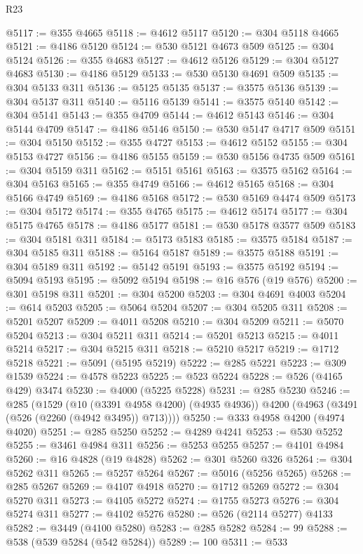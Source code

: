 \begin{lexlean}{R23}
\begin{coremodule}
@5117 := @355 @4665
@5118 := @4612 @5117
@5120 := @304 @5118 @4665
@5121 := @4186 @5120
@5124 := @530 @5121 @4673 @509
@5125 := @304 @5124
@5126 := @355 @4683
@5127 := @4612 @5126
@5129 := @304 @5127 @4683
@5130 := @4186 @5129
@5133 := @530 @5130 @4691 @509
@5135 := @304 @5133 @311
@5136 := @5125 @5135
@5137 := @3575 @5136
@5139 := @304 @5137 @311
@5140 := @5116 @5139
@5141 := @3575 @5140
@5142 := @304 @5141
@5143 := @355 @4709
@5144 := @4612 @5143
@5146 := @304 @5144 @4709
@5147 := @4186 @5146
@5150 := @530 @5147 @4717 @509
@5151 := @304 @5150
@5152 := @355 @4727
@5153 := @4612 @5152
@5155 := @304 @5153 @4727
@5156 := @4186 @5155
@5159 := @530 @5156 @4735 @509
@5161 := @304 @5159 @311
@5162 := @5151 @5161
@5163 := @3575 @5162
@5164 := @304 @5163
@5165 := @355 @4749
@5166 := @4612 @5165
@5168 := @304 @5166 @4749
@5169 := @4186 @5168
@5172 := @530 @5169 @4474 @509
@5173 := @304 @5172
@5174 := @355 @4765
@5175 := @4612 @5174
@5177 := @304 @5175 @4765
@5178 := @4186 @5177
@5181 := @530 @5178 @3577 @509
@5183 := @304 @5181 @311
@5184 := @5173 @5183
@5185 := @3575 @5184
@5187 := @304 @5185 @311
@5188 := @5164 @5187
@5189 := @3575 @5188
@5191 := @304 @5189 @311
@5192 := @5142 @5191
@5193 := @3575 @5192
@5194 := @5094 @5193
@5195 := @5092 @5194
@5198 := @16 @576 (@19 @576)
@5200 := @301 @5198 @311
@5201 := @304 @5200
@5203 := @304 @4691 @4003
@5204 := @614 @5203
@5205 := @5064 @5204
@5207 := @304 @5205 @311
@5208 := @5201 @5207
@5209 := @4011 @5208
@5210 := @304 @5209
@5211 := @5070 @5204
@5213 := @304 @5211 @311
@5214 := @5201 @5213
@5215 := @4011 @5214
@5217 := @304 @5215 @311
@5218 := @5210 @5217
@5219 := @1712 @5218
@5221 := @5091 (@5195 @5219)
@5222 := @285 @5221
@5223 := @309 @1539
@5224 := @4578 @5223
@5225 := @523 @5224
@5228 := @526 (@4165 @429) @3474
@5230 := @4000 (@5225 @5228)
@5231 := @285 @5230
@5246 := @285
    (@1529
      (@10 (@3391 @4958 @4200) (@4935 @4936))
      @4200
      (@4963 (@3491 (@526 (@2260 (@4942 @3495)) @713))))
@5250 := @333 @4958 @4200 (@4974 @4020)
@5251 := @285 @5250
@5252 := @4289 @4241
@5253 := @530 @5252
@5255 := @3461 @4984 @311
@5256 := @5253 @5255
@5257 := @4101 @4984
@5260 := @16 @4828 (@19 @4828)
@5262 := @301 @5260 @326
@5264 := @304 @5262 @311
@5265 := @5257 @5264
@5267 := @5016 (@5256 @5265)
@5268 := @285 @5267
@5269 := @4107 @4918
@5270 := @1712 @5269
@5272 := @304 @5270 @311
@5273 := @4105 @5272
@5274 := @1755 @5273
@5276 := @304 @5274 @311
@5277 := @4102 @5276
@5280 := @526 (@2114 @5277) @4133
@5282 := @3449 (@4100 @5280)
@5283 := @285 @5282
@5284 := 99
@5288 := @538 (@539 @5284 (@542 @5284))
@5289 := 100
@5311 := @533

\end{coremodule}
\end{lexlean}
